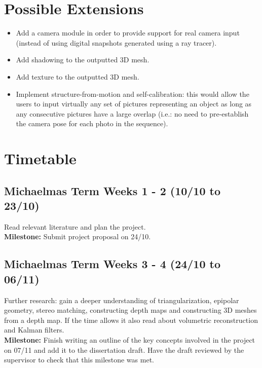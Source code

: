 \section*{Possible Extensions}
\begin{itemize}
\item Add a camera module in order to provide support for real camera input (instead of using digital snapshots generated using a ray tracer).
\item Add shadowing to the outputted 3D mesh. 
\item Add texture to the outputted 3D mesh.
\item Implement structure-from-motion and self-calibration: this would allow the users to input virtually any set of pictures representing an object as long as any consecutive pictures have a large overlap (i.e.: no need to pre-establish the camera pose for each photo in the sequence).
\end{itemize}

\section*{Timetable}

\subsection*{Michaelmas Term Weeks 1 - 2 (10/10 to 23/10)}
Read relevant literature and plan the project.\\
{\bf Milestone:} Submit project proposal on 24/10.

\subsection*{Michaelmas Term Weeks 3 - 4 (24/10 to 06/11)}
Further research: gain a deeper understanding of triangularization, epipolar geometry, stereo matching, constructing depth maps and constructing 3D meshes from a depth map. If the time allows it also read about volumetric reconstruction and Kalman filters.  \\
{\bf Milestone:} Finish writing an outline of the key concepts involved in the project on 07/11 and add it to the dissertation draft. Have the draft reviewed by the supervisor to check that this milestone was met.

